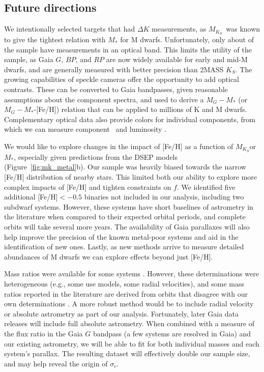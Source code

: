 \documentclass[twocolumn]{aastex62}
\newcommand{\mks}{$M_{K_S}$}
\begin{document}
\subsection{Future directions}

We intentionally selected targets that had $\Delta K$ measurements, as \mks\ was known to give the tightest relation with $M_*$ for M dwarfs. Unfortunately, only about  of the sample have measurements in an optical band. This limits the utility of the sample, as Gaia $G$, $BP$, and $RP$ are now widely available for early and mid-M dwarfs, and are generally measured with better precision than 2MASS $K_S$. The growing capabilities of speckle cameras \citep[e.g.,][]{2009AJ....137.5057H} offer the opportunity to add optical contrasts. These can be converted to Gaia bandpasses, given reasonable assumptions about the component spectra, and used to derive a $M_{G}-M_*$ (or $M_G-M_*$-[Fe/H]) relation that can be applied to millions of K and M dwarfs. Complementary optical data also provide colors for individual components, from which we can measure component \teff\ and luminosity \citep[e.g.,][]{2017ApJ...845...72K}.

We would like to explore changes in the impact of [Fe/H] as a function of \mks or $M_*$, especially given predictions from the DSEP models (Figure~\ref{fig:mk_metal}b). Our sample was heavily biased towards the narrow [Fe/H] distribution of nearby stars. This limited both our ability to explore more complex impacts of [Fe/H] and tighten constraints on $f$. We identified five additional [Fe/H]$<-0.5$ binaries not included in our analysis, including two subdwarf systems. However, these systems have short baselines of astrometry in the literature when compared to their expected orbital periods, and complete orbits will take several more years. The availability of Gaia parallaxes will also help improve the precision of the known metal-poor systems and aid in the identification of new ones. Lastly, as new methods arrive to measure detailed abundances of M dwarfs \citep{Veyette2016a,Veyette2017} we can explore effects beyond just [Fe/H]. 

Mass ratios were available for some systems \citep[e.g.,][]{Soderhjelm1999,Mlg2007b,Dupuy2017}. However, these determinations were heterogeneous (e.g., some use models, some radial velocities), and some mass ratios reported in the literature are derived from orbits that disagree with our own determinations \citep[e.g.,][]{Koh2012}. A more robust method would be to include radial velocity or absolute astrometry as part of our analysis. Fortunately, later Gaia data releases will include full absolute astrometry. When combined with a measure of the flux ratio in the Gaia $G$ bandpass (a few systems are resolved in Gaia) and our existing astrometry, we will be able to fit for both individual masses and each system's parallax. The resulting dataset will effectively double our sample size, and may help reveal the origin of $\sigma_e$. 
\end{document}
